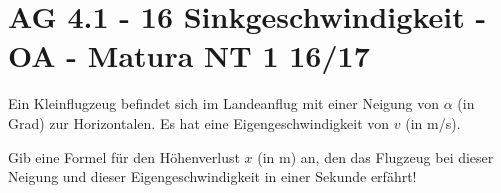 \section{AG 4.1 - 16 Sinkgeschwindigkeit - OA - Matura NT 1 16/17}

\begin{beispiel}[AG 4.1]{1} %
Ein Kleinflugzeug befindet sich im Landeanflug mit einer Neigung von $\alpha$ (in Grad) zur Horizontalen. Es hat eine Eigengeschwindigkeit von $v$ (in m/s).

Gib eine Formel für den Höhenverlust $x$ (in m) an, den das Flugzeug bei dieser Neigung und dieser Eigengeschwindigkeit in einer Sekunde erfährt!

\end{beispiel}